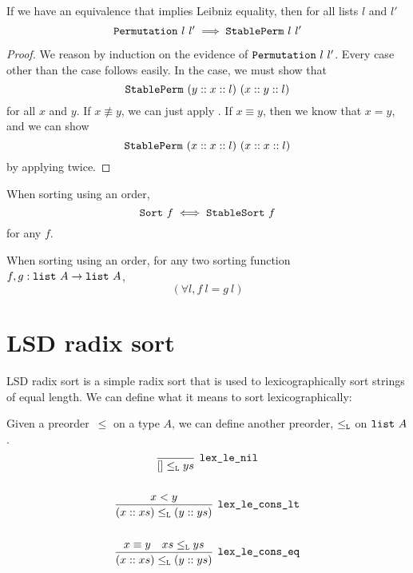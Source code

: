 \documentclass[sigplan,10pt,anonymous,review]{thesis}
\begin{document}
\begin{theorem}
  If we have an equivalence that implies Leibniz equality, then for
  all lists $l$ and $l'$
  \begin{equation*}
    \texttt{\textup{Permutation}}~l~l' \implies \texttt{\textup{StablePerm}}~l~l'
  \end{equation*}
\end{theorem}
\begin{proof}
  We reason by induction on the evidence of $\texttt{\textup{Permutation}}~l~l'$.
  Every case other than the  case follows easily.
  In the  case, we must show that
  \begin{equation*}
    \texttt{\textup{StablePerm}}~(y :: x :: l)~(x :: y :: l)
  \end{equation*}
  for all $x$ and $y$. If $x \not\equiv y$, we can just apply
  . If $x \equiv y$, then we know that $x = y$, and
  we can show
  \begin{equation*}
    \texttt{\textup{StablePerm}}~(x :: x :: l)~(x :: x :: l)
  \end{equation*}
  by applying  twice.
\end{proof}

\begin{corollary}
  \label{thm:stablesort_ord}
  When sorting using an order,
  \begin{equation*}
    \texttt{\textup{Sort}}~f \iff \texttt{\textup{StableSort}}~f
  \end{equation*}
  for any $f$.
\end{corollary}

\begin{corollary}
  \label{thm:sort_ord_unique}
  When sorting using an order, for any two sorting function $f, g:
  \texttt{\textup{list}}~A \to \texttt{\textup{list}}~A$,
  \begin{equation*}
    (\forall l, f~l = g~l)
  \end{equation*}
\end{corollary}

\section{LSD radix sort}
\label{sec:radix_sort}

LSD radix sort is a simple radix sort that is used to
lexicographically sort strings of equal length. We can define what it
means to sort lexicographically:

\begin{definition}[lex\_le]
  Given a preorder~$\le$ on a type $A$, we can define another preorder,
  $\le_{\texttt{\textup{L}}}$ on $\texttt{\textup{list}}~A$.
  \begin{gather*}
    \infer[\var{lex\_le\_nil}]{[] \lexle ys}{}
    \\
    \\
    \infer[\var{lex\_le\_cons\_lt}]{(x :: xs) \lexle (y :: ys)}{%
      x < y
    }
    \\
    \\
    \infer[\var{lex\_le\_cons\_eq}]{(x :: xs) \lexle (y :: ys)}{%
      x \equiv y & xs \lexle ys
    }
  \end{gather*}
\end{definition}
\end{document}
